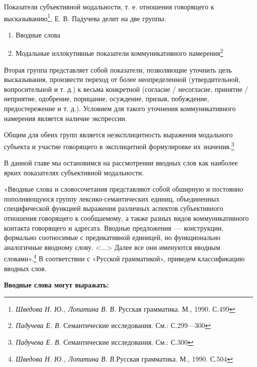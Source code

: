 \documentclass{kursa4}
\begin{document}
{      Показатели субъективной модальности, т. е. отношения говорящего к
      высказыванию\footnote{\textit{ Шведова Н. Ю., Лопатина
      В. В.} Русская грамматика. М., 1990. С.499}, Е. В. Падучева делит на две группы: 

      \begin{enumerate}
        \item Вводные слова
        \item Модальные иллокутивные показатели коммуникативного
        намерения\footnote{\textit{Падучева Е. В.} Семантические исследования. См.: С.299—300}        
      \end{enumerate}

      Вторая группа представляет собой показатели, позволяющие уточнить цель
      высказывания, произвести переход от более неопределенной
      (утвердительной, вопросительной и т. д.) к весьма конкретной (согласие
      / несогласие, принятие / неприятие, одобрение, порицание, осуждение,
      призыв, побуждение, предостережение и т. д.). Условием для такого
      уточнения коммуникативного намерения является наличие экспрессии. 

      Общим для обеих групп является неэксплицитность выражения модального
      субъекта и участие говорящего в эксплицитной формулировке их
      значения.\footnote{\textit{Падучева Е. В.
      }Семантические исследования. См.: С.300}

      В данной главе мы остановимся на рассмотрении вводных слов как
      наиболее ярких показателях субъективной модальности.

      «Вводные слова и словосочетания представляют собой обширную и
      постоянно пополняющуюся группу лексико-семантических единиц,
      объединенных специфической функцией выражения различных аспектов
      субъективного отношения говорящего к сообщаемому, а также разных видов
      коммуникативного контакта говорящего и адресата. Вводные предложения~---
      конструкции, формально соотносимые с предикативной единицей, но
      функционально аналогичные вводному слову. \textless{}...\textgreater{}
      Далее все они именуются вводным
      словами».\footnote{\textit{Шведова Н. Ю., Лопатина В. В.}{Русская грамматика. М., 1990. С.504}}\newline
      В соответствии с «Русской грамматикой», приведем классификацию вводных слов.

      \textbf{Вводные слова могут выражать:}

}
\end{document}
